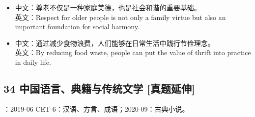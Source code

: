 \documentclass[a4paper,11pt,UTF8,fontset=none]{ctexart}
\begin{document}
\par

\begin{itemize}[leftmargin=1.7em,itemsep=1pt,parsep=0pt,topsep=2pt]
\item \noindent 中文：尊老不仅是一种家庭美德，也是社会和谐的重要基础。\\ 英文：Respect for older people is not only a family virtue but also an important foundation for social harmony.\par


\item \noindent 中文：通过减少食物浪费，人们能够在日常生活中践行节俭理念。\\ 英文：By reducing food waste, people can put the value of thrift into practice in daily life.\par


\end{itemize}

\subsection{34 中国语言、典籍与传统文学 {\color{AccentBlue} [真题延伸]}}

\begin{tcolorbox}[enhanced,breakable,boxrule=0.35pt,colback=VeryPaleBlue,colframe=AccentBlue!40,left=7pt,right=7pt,top=4pt,bottom=4pt,borderline west={2pt}{0pt}{AccentBlue},before skip=4pt,after skip=6pt]
：2019-06 CET-6：汉语、方言、成语；2020-09：古典小说。\par


\end{tcolorbox}
\end{document}
